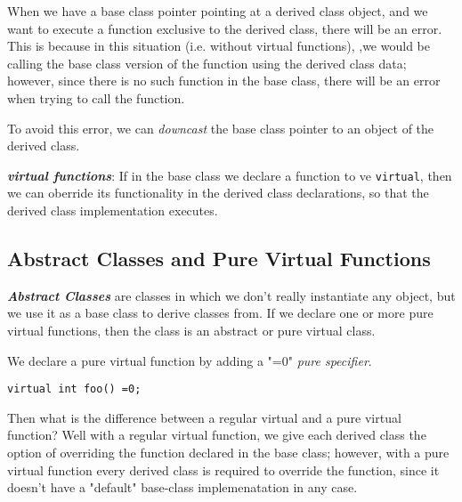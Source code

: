 \documentclass{article}
\begin{document}
When we have a base class pointer pointing at a derived class object, and we want to execute a function
exclusive to the derived class, there will be an error. This is because in this situation (i.e. without virtual 
functions), ,we would be calling the base class version of the function using the derived class data; however, 
since there is no such function in the base class, there will be an error when trying to call the function.

To avoid this error, we can \textit{downcast} the base class pointer to an object of the derived class. 

\textbf{\textit{virtual functions}}: If in the base class we declare a function to ve \texttt{virtual}, then 
we can oberride its functionality in the derived class declarations, so that the derived class implementation
executes.
\subsection{Abstract Classes and Pure Virtual Functions}
\textbf{\textit{Abstract Classes}} are classes in which we don't really instantiate any object, but we use it 
as a base class to derive classes from. If we declare one or more pure virtual functions, then the class is an
abstract or pure virtual class.

We declare a pure virtual function by adding a "=0" \textit{pure specifier}. 
\begin{verbatim}
virtual int foo() =0;
\end{verbatim}
Then what is the difference between a regular virtual and a pure virtual function? Well with a regular virtual 
function, we give each derived class the option of overriding the function declared in the base class; however,
with a pure virtual function every derived class is required to override the function, since it doesn't have a
"default" base-class implemenatation in any case. 
\end{document}
